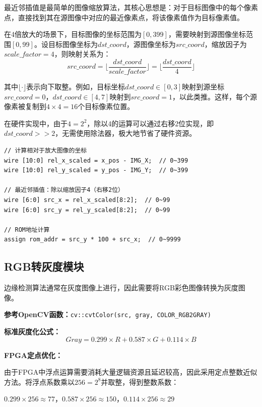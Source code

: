 \documentclass[12pt,hyperref,a4paper,UTF8]{ctexart}
\begin{document}
最近邻插值是最简单的图像缩放算法，其核心思想是：对于目标图像中的每个像素点，直接找到其在源图像中对应的最近像素点，将该像素值作为目标像素值。

在4倍放大的场景下，目标图像的坐标范围为$[0, 399]$，需要映射到源图像坐标范围$[0, 99]$。设目标图像坐标为$dst\_coord$，源图像坐标为$src\_coord$，缩放因子为$scale\_factor=4$，则映射关系为：
\begin{equation}
src\_coord = \lfloor \frac{dst\_coord}{scale\_factor} \rfloor = \lfloor \frac{dst\_coord}{4} \rfloor
\end{equation}

其中$\lfloor \cdot \rfloor$表示向下取整。例如，目标坐标$dst\_coord \in [0,3]$映射到源坐标$src\_coord=0$，$dst\_coord \in [4,7]$映射到$src\_coord=1$，以此类推。这样，每个源像素被复制到$4 \times 4 = 16$个目标像素位置。

在硬件实现中，由于$4 = 2^2$，除以4的运算可以通过右移2位实现，即$dst\_coord >> 2$，无需使用除法器，极大地节省了硬件资源。

\begin{lstlisting}[caption={坐标映射模块代码}]
// 计算相对于放大图像的坐标
wire [10:0] rel_x_scaled = x_pos - IMG_X;  // 0~399
wire [10:0] rel_y_scaled = y_pos - IMG_Y;  // 0~399

// 最近邻插值：除以缩放因子4（右移2位）
wire [6:0] src_x = rel_x_scaled[8:2];  // 0~99
wire [6:0] src_y = rel_y_scaled[8:2];  // 0~99

// ROM地址计算
assign rom_addr = src_y * 100 + src_x;  // 0~9999
\end{lstlisting}

\subsection{RGB转灰度模块}

边缘检测算法通常在灰度图像上进行，因此需要将RGB彩色图像转换为灰度图像。

\textbf{参考OpenCV函数：}\texttt{cv::cvtColor(src, gray, COLOR\_RGB2GRAY)}

\textbf{标准灰度化公式：}
\begin{equation}
Gray = 0.299 \times R + 0.587 \times G + 0.114 \times B
\end{equation}

\textbf{FPGA定点优化：}

由于FPGA中浮点运算需要消耗大量逻辑资源且延迟较高，因此采用定点整数近似方法。将浮点系数乘以$256 = 2^8$并取整，得到整数系数：

$0.299 \times 256 \approx 77$，$0.587 \times 256 \approx 150$，$0.114 \times 256 \approx 29$
\end{document}
